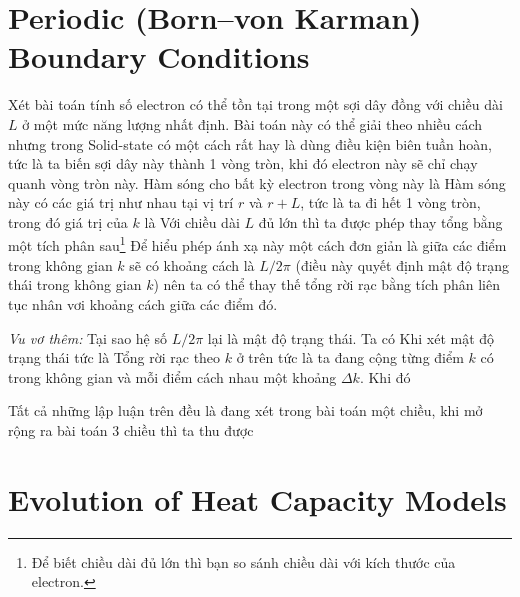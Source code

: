 \section{Periodic (Born–von Karman) Boundary Conditions}
Xét bài toán tính số electron có thể tồn tại trong một sợi dây đồng với chiều dài $L$ ở một mức năng lượng nhất định. 
Bài toán này có thể giải theo nhiều cách nhưng trong Solid-state có một cách rất hay là dùng điều kiện biên tuần hoàn, tức là ta biến sợi dây này thành 1 vòng tròn, 
khi đó electron này sẽ chỉ chạy quanh vòng tròn này. Hàm sóng cho bất kỳ electron trong vòng này là 
Hàm sóng này có các giá trị như nhau tại vị trí $r$ và $r +L$, tức là ta đi hết 1 vòng tròn, trong đó giá trị của $k$ là
Với chiều dài $L$ đủ lớn thì ta được phép thay tổng bằng một tích phân sau\footnote{Để biết chiều dài đủ lớn thì bạn so sánh chiều dài với kích thước của electron.}
Để hiểu phép ánh xạ này một cách đơn giản là giữa các điểm trong không gian $k$ sẽ có khoảng cách là $L/2\pi$ (điều này quyết định mật độ trạng thái trong không gian $k$)
nên ta có thể thay thế tổng rời rạc bằng tích phân liên tục nhân vơi khoảng cách giữa các điểm đó.  
    \begin{more}
        \textit{Vu vơ thêm:} Tại sao hệ số $L/2\pi$ lại là mật độ trạng thái. Ta có
        Khi xét mật độ trạng thái tức là
        Tổng rời rạc theo $k$ ở trên tức là ta đang cộng từng điểm $k$ có trong không gian và mỗi điểm cách nhau một khoảng $\Delta k$. Khi đó
    \end{more}
Tất cả những lập luận trên đều là đang xét trong bài toán một chiều, khi mở rộng ra bài toán 3 chiều thì ta thu được
\section{Evolution of Heat Capacity Models}
